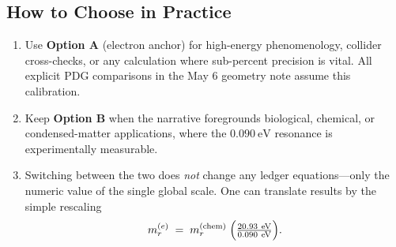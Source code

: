 \documentclass[11pt,oneside]{book}
\begin{document}
\subsection*{How to Choose in Practice}

\begin{enumerate}
\item Use \textbf{Option A} (electron anchor) for high-energy phenomenology,
      collider cross-checks, or any calculation where sub-percent precision is
      vital.  All explicit PDG comparisons in the May 6 geometry note assume this
      calibration.
\item Keep \textbf{Option B} when the narrative foregrounds biological,
      chemical, or condensed-matter applications, where the $0.090\ \mathrm{eV}$
      resonance is experimentally measurable.
\item Switching between the two does \emph{not} change any ledger equations—only
      the numeric value of the single global scale.  One can translate results by
      the simple rescaling
      \[
          m^{(e)}_{r} \;=\; m^{(\text{chem})}_{r}\;
                          \Bigl(\tfrac{20.93\ \mathrm{eV}}{0.090\ \mathrm{eV}}\Bigr).
      \]
\end{enumerate}
\end{document}

